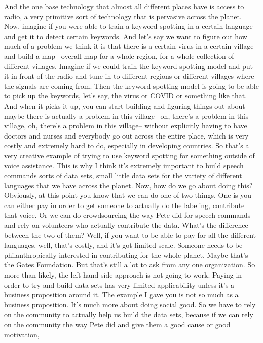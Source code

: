 And the one base technology that almost all different places have
is access to radio, a very primitive sort of technology
that is pervasive across the planet.
Now, imagine if you were able to train a keyword spotting in a certain language
and get it to detect certain keywords.
And let's say we want to figure out how much of a problem
we think it is that there is a certain virus in a certain village
and build a map-- overall map for a whole region,
for a whole collection of different villages.
Imagine if we could train the keyword spotting model
and put it in front of the radio and tune
in to different regions or different villages
where the signals are coming from.
Then the keyword spotting model is going to be
able to pick up the keywords, let's say, the virus or COVID or something
like that.
And when it picks it up, you can start building and figuring things
out about maybe there is actually a problem in this village--
oh, there's a problem in this village, oh, there's a problem in this village--
without explicitly having to have doctors and nurses
and everybody go out across the entire place,
which is very costly and extremely hard to do,
especially in developing countries.
So that's a very creative example of trying
to use keyword spotting for something outside of voice assistance.
This is why I think it's extremely important to build speech commands
sorts of data sets, small little data sets
for the variety of different languages that we have across the planet.
Now, how do we go about doing this?
Obviously, at this point you know that we can do one of two things.
One is you can either pay in order to get someone to actually do
the labeling, contribute that voice.
Or we can do crowdsourcing the way Pete did for speech commands
and rely on volunteers who actually contribute the data.
What's the difference between the two of them?
Well, if you want to be able to pay for all the different languages,
well, that's costly, and it's got limited scale.
Someone needs to be philanthropically interested in contributing
for the whole planet.
Maybe that's the Gates Foundation.
But that's still a lot to ask from any one organization.
So more than likely, the left-hand side approach is not going to work.
Paying in order to try and build data sets
has very limited applicability unless it's a business proposition around it.
The example I gave you is not so much as a business proposition.
It's much more about doing social good.
So we have to rely on the community to actually help us build the data sets,
because if we can rely on the community the way Pete did
and give them a good cause or good motivation,
